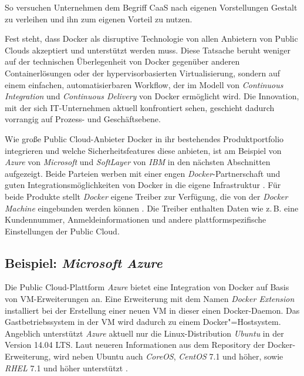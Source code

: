 \documentclass[../main.tex]{subfiles}
\begin{document}
    So versuchen Unternehmen dem Begriff CaaS nach eigenen Vorstellungen Gestalt zu verleihen und ihn zum eigenen Vorteil zu nutzen.

    Fest steht, dass Docker als disruptive Technologie von allen Anbietern von Public Clouds akzeptiert und unterstützt werden muss. Diese Tatsache beruht weniger auf der technischen Überlegenheit von Docker gegenüber anderen Containerlösungen oder der hypervisorbasierten Virtualisierung, sondern auf einem einfachen, automatisierbaren Workflow, der im Modell von \emph{Continuous Integration} und \emph{Continuous Delivery} von Docker ermöglicht wird. Die Innovation, mit der sich IT-Unternehmen aktuell konfrontiert sehen, geschieht dadurch vorrangig auf Prozess- und Geschäftsebene.

    Wie große Public Cloud-Anbieter Docker in ihr bestehendes Produktportfolio integrieren und welche Sicherheitsfeatures diese anbieten, ist am Beispiel von \emph{Azure} von \emph{Microsoft} und \emph{SoftLayer} von \emph{IBM} in den nächsten Abschnitten aufgezeigt. Beide Parteien werben mit einer engen \emph{Docker}-Partnerschaft und guten Integrationsmöglichkeiten von Docker in die eigene Infrastruktur \cite{dockerPartnershipMicrosoft}\cite{dockerPartnershipIBM}. Für beide Produkte stellt \emph{Docker} eigene Treiber zur Verfügung, die von der \emph{Docker Machine} eingebunden werden können \cite{dockerMachineDriverAzure}\cite{dockerMachineDriverSoftlayer}. Die Treiber enthalten Daten wie z.\,B. eine Kundennummer, Anmeldeinformationen und andere plattformspezifische Einstellungen der Public Cloud.

    \subsection{Beispiel: \emph{Microsoft Azure}}
    \label{azure}
      Die Public Cloud-Plattform \emph{Azure} bietet eine Integration von Docker auf Basis von VM-Erweiterungen an. Eine Erweiterung mit dem Namen \emph{Docker Extension} installiert bei der Erstellung einer neuen VM in dieser einen Docker-Daemon. Das Gastbetriebssystem in der VM wird dadurch zu einem Docker"=Hostsystem. Angeblich unterstützt \emph{Azure} aktuell nur die Linux-Distribution \emph{Ubuntu} in der Version 14.04 \acrshort{LTS}. Laut neueren Informationen aus dem Repository der Docker-Erweiterung, wird neben Ubuntu auch \emph{CoreOS}, \emph{CentOS} 7.1 und höher, sowie \emph{\acrshort{RHEL}} 7.1 und höher unterstützt \cite{githubAzureVMExtension}.

\end{document}

